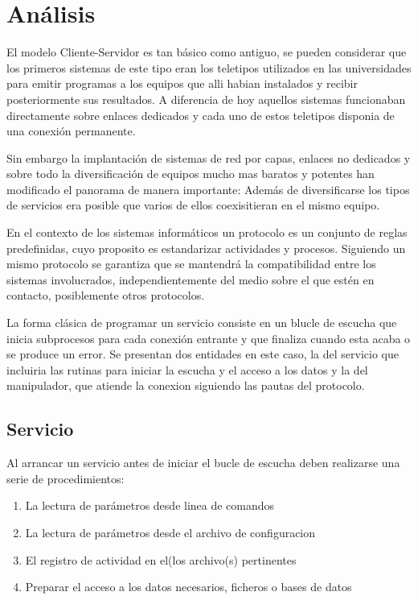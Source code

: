 \documentclass[a4paper,spanish,12pt]{book}
\begin{document}
\chapter{Análisis}
El modelo Cliente-Servidor es tan básico como antiguo, se pueden considerar que los primeros sistemas de este tipo eran los teletipos utilizados en las universidades para emitir programas a los equipos que alli habian instalados y recibir posteriormente sus resultados. A diferencia de hoy aquellos sistemas funcionaban directamente sobre enlaces dedicados y cada uno de estos teletipos disponia de una conexión permanente.

Sin embargo la implantación de sistemas de red por capas, enlaces no dedicados y sobre todo la diversificación de equipos mucho mas baratos y potentes han modificado el panorama de manera importante: Además de diversificarse los tipos de servicios era posible que varios de ellos coexisitieran en el mismo equipo.

En el contexto de los sistemas informáticos un protocolo es un conjunto de reglas predefinidas, cuyo proposito es estandarizar actividades y procesos. Siguiendo un mismo protocolo se garantiza que se mantendrá la compatibilidad entre los sistemas involucrados, independientemente del medio sobre el que est\'en en contacto, posiblemente otros protocolos.


La forma cl\'asica de programar un servicio consiste en un blucle de escucha que inicia subprocesos para cada conexi\'on entrante y que finaliza cuando esta acaba o se produce un error. Se presentan dos entidades en este caso, la del servicio que incluiria las rutinas para iniciar la escucha y el acceso a los datos y la del manipulador, que atiende la conexion siguiendo las pautas del protocolo.
\section{Servicio}
Al arrancar un servicio antes de iniciar el bucle de escucha deben realizarse una serie de procedimientos:
\begin{enumerate}
	\item La lectura de parámetros desde linea de comandos
	\item La lectura de parámetros desde el archivo de configuracion
	\item El registro de actividad en el(los archivo(s) pertinentes
	\item Preparar el acceso a los datos necesarios, ficheros o bases de datos
\end{enumerate}
\end{document}
